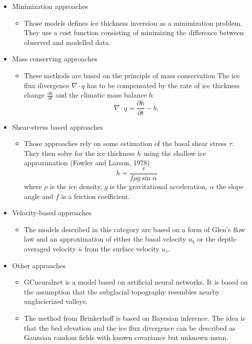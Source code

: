 \documentclass[a4, 12pt]{article}
\newcommand{\citeg}[1]{\citep[e.g.][]{#1}}
\begin{document}
\begin{itemize}
	\item Minimization approaches
		\begin{itemize}
			\item Those models defines ice thickness inversion as a minimization problem. They use a cost 					function consisting of minimizing the difference between observed and modelled data. 	
		\end{itemize}
	\item Mass conserving approaches
		\begin{itemize}
			\item These methods are based on the principle of mass conservation 												\cite{farinotti2016accurate} The ice flux divergence $\nabla \cdot q$ has to be compensated by the rate of ice thickness change $\frac{\partial h}{\partial t}$ and the climatic mass balance $ \dot{b}$:
					\begin{equation}
						\nabla \cdot q = \frac{\partial h}{\partial t} - \dot{b},
					\end{equation}
		\end{itemize}
	\item Shear-stress based approaches
		\begin{itemize}
			\item Those approaches rely on some estimation of the basal shear stress $\tau$. They then 					solve for the ice thickness $h$ using the shallow ice approximation (Fowler and Larson, 1978)
			\begin{equation}
					h = \frac{\tau}{f\rho g \sin{\alpha}} %
			\end{equation}
			where $\rho$ is the ice density, $g$ is the gravitational acceleration, $\alpha$ the slope 					angle and $f$ is a friction coefficient.
		\end{itemize}
	\item Velocity-based approaches
		\begin{itemize}
			\item The models described in this category are based on a form of Glen's flow law \citeg{glen1958flow} and an approximation of either the basal velocity $u_b$ or the depth-averaged  				velocity $\bar{u}$ from the surface velocity $u_s$.
		\end{itemize} 
	\item Other approaches
		\begin{itemize}
			\item GCneuralnet\citep{clarke2009neural} is a model based on artificial neural networks. It is based on the assumption that the subglacial topography resembles nearby unglacierized valleys.
			\item The method from Brinkerhoff \citep{brinkerhoff2016bayesian} is based on Bayesian inference. The idea is that the bed elevation and the ice flux divergence can be described as Gaussian random fields with known covariance but unknown mean.
		\end{itemize}		
\end{itemize}
\end{document}
